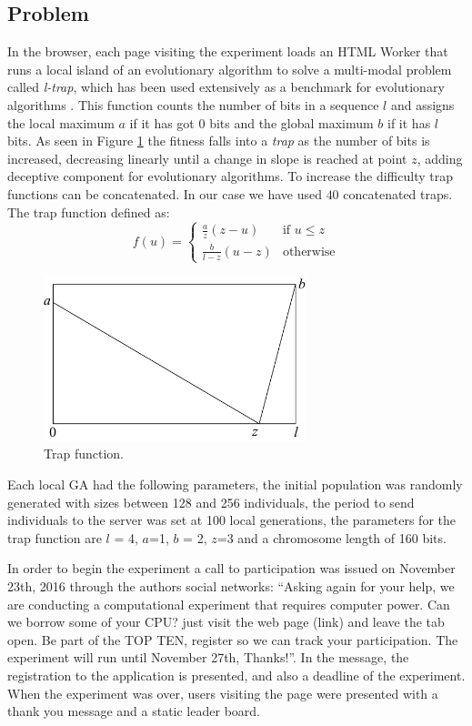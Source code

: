 \documentclass{llncs}
\begin{document}
\subsection{Problem}
In the browser, each page visiting the experiment loads an HTML Worker
that runs a local island of an evolutionary algorithm to solve a
multi-modal problem called {\em l-trap}, which has been used extensively 
as a benchmark for evolutionary algorithms \cite{fernandes2009using,nijssen2003analysis}. 
This function counts the number of bits in a sequence $l$ and assigns
the local maximum $a$ if it has got 0 bits and the global maximum $b$ if it has $l$
bits. As seen in Figure \ref{fig:trap} the fitness falls into a {\em trap} 
as the number of bits is increased, decreasing linearly until a change in slope 
is reached at point $z$, adding deceptive component for evolutionary algorithms. 
To increase the difficulty trap functions can be concatenated. 
In our case we have used $40$ concatenated traps. The trap function  defined as:   
\[ f(u)= 
    \begin{cases} 
      \frac{a}{z}(z-u) & \text{if } u\leq z\\
      \frac{b}{l-z} (u-z)& \text{otherwise} 
   \end{cases}
\]
\begin{figure}[t]
    \centering
        \includegraphics[width=3in]{img/trap.png}
    \caption{Trap function.
    }
    \label{fig:trap}
\end{figure}

Each local GA had the following parameters, the initial population was randomly generated 
with sizes between 128 and 256 individuals, the period to send individuals to the server
was set at 100 local generations, the parameters for the trap function are $l$ = 4,
$a$=1, $b$ = 2, $z$=3 and a chromosome length of 160 bits.

In order to begin the experiment a call to participation was issued on November 23th, 
2016 through the authors social networks:
``Asking again for your help, we are conducting a computational experiment
that requires computer power. Can we borrow some of your CPU? just visit the web page (link)
and leave the tab open. Be part of the TOP TEN, register so we can track your participation.
The experiment will run until November 27th, Thanks!''. In the message, the registration
to the application is presented, and also a deadline of the experiment. When the
experiment was over, users visiting the page were presented with a thank you message 
and a static leader board. 
\end{document}
